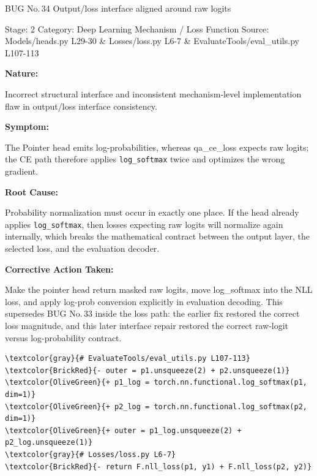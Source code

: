 \documentclass[10pt]{article}
\newcommand{\FieldLabel}[1]{%
 {\bfseries #1:}\par
}
\begin{document}
\begin{bugbox}{BUG No.\,34 \quad Output/loss interface aligned around raw logits}
{\color{MetaGray}\small Stage: 2 \;\textbar\; Category: Deep Learning Mechanism / Loss Function \;\textbar\; Source: Models/heads.py L29-30 \& Losses/loss.py L6-7 \& EvaluateTools/eval\_utils.py L107-113\par}
\vspace{0.22em}
\FieldLabel{Nature}
Incorrect structural interface and inconsistent mechanism-level implementation flaw in output/loss interface consistency.
\par
\vspace{0.35em}
\FieldLabel{Symptom}
The Pointer head emits log-probabilities, whereas qa\_ce\_loss expects raw logits; the CE path therefore applies \texttt{log\_softmax} twice and optimizes the wrong gradient.
\par
\vspace{0.35em}
\FieldLabel{Root Cause}
Probability normalization must occur in exactly one place. If the head already applies \texttt{log\_softmax}, then losses expecting raw logits will normalize again internally, which breaks the mathematical contract between the output layer, the selected loss, and the evaluation decoder.
\par
\vspace{0.35em}
\FieldLabel{Corrective Action Taken}
Make the pointer head return masked raw logits, move log\_softmax into the NLL loss, and apply log-prob conversion explicitly in evaluation decoding. This supersedes BUG No.\,33 inside the loss path: the earlier fix restored the correct loss magnitude, and this later interface repair restored the correct raw-logit versus log-probability contract.
\par
\vspace{0.35em}
\begin{Verbatim}[commandchars=\\\{\},fontsize=\footnotesize,breaklines=true,breaksymbol={},frame=leftline,framerule=2pt,rulecolor=\color{gray!40},xleftmargin=6pt,formatcom=\singlespacing]
\textcolor{gray}{# EvaluateTools/eval_utils.py L107-113}
\textcolor{BrickRed}{- outer = p1.unsqueeze(2) + p2.unsqueeze(1)}
\textcolor{OliveGreen}{+ p1_log = torch.nn.functional.log_softmax(p1, dim=1)}
\textcolor{OliveGreen}{+ p2_log = torch.nn.functional.log_softmax(p2, dim=1)}
\textcolor{OliveGreen}{+ outer = p1_log.unsqueeze(2) + p2_log.unsqueeze(1)}
\textcolor{gray}{# Losses/loss.py L6-7}
\textcolor{BrickRed}{- return F.nll_loss(p1, y1) + F.nll_loss(p2, y2)}

\end{Verbatim}
\end{bugbox}
\end{document}
